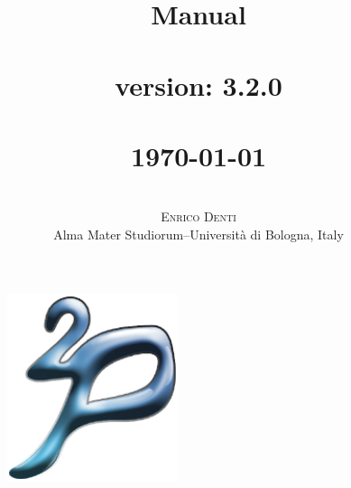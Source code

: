 \documentclass[11pt]{report}
\title{{\Huge{\bf{\tuprolog{} Manual\\\mbox{ }\\}}}
        \tuprolog{} version: 3.2.0\\\mbox{ }\\
{\small\today\\}
}
\author{ \mbox{ }\\ \textsc{Enrico Denti}\\Alma Mater Studiorum--Universit\`{a} di Bologna, Italy
}
\date{}
\newcommand\logo{
    \begin{figure}[tp]
        \begin{center}
            \includegraphics[width=5cm]{images/logo}
        \end{center}
\end{figure}
}
\begin{document}
\logo

\maketitle

\tableofcontents













\end{document}

